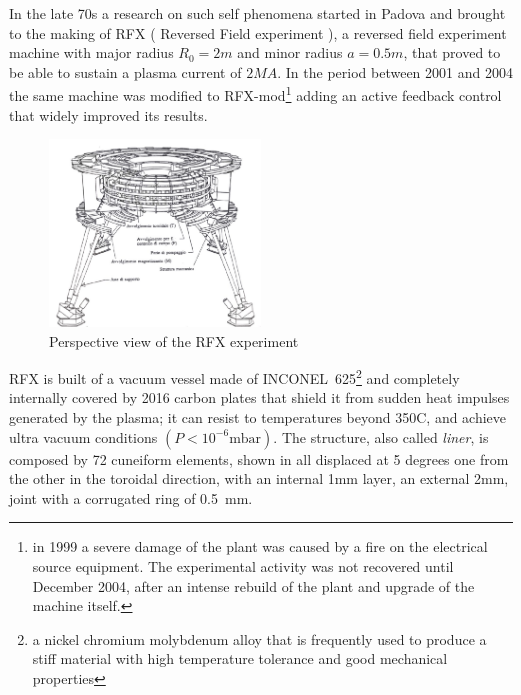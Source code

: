 In the late 70s a research on such self phenomena started in Padova and brought to the making of RFX ( Reversed Field experiment ), a reversed field experiment machine with major radius $R_0 = 2m$ and minor radius $a = 0.5m$, that proved to be able to sustain a plasma current of $2MA$. In the period between 2001 and 2004 the same machine was modified to RFX-mod\footnote{in 1999 a severe damage of the plant was caused by a fire on the electrical source equipment. The experimental activity was not recovered until December 2004, after an intense rebuild of the plant and upgrade of the machine itself.} adding an active feedback control that widely improved its results.
\begin{figure}[ht!]
\centering
\includegraphics[width=0.5\textwidth]{img/rfx2}
\caption{ Perspective view of the RFX experiment }
\label{img:rfx}
\end{figure}
%
RFX is built of a vacuum vessel made of INCONEL~625\footnote{a nickel chromium molybdenum alloy that is frequently used to produce a stiff material with high temperature tolerance and good mechanical properties} and completely internally covered by 2016 carbon plates that shield it from sudden heat impulses generated by the plasma; it can resist to temperatures beyond 350C, and achieve ultra vacuum conditions $(P < 10^{-6} \text{mbar})$.
The structure, also called \textit{liner}, is composed by 72 cuneiform elements, shown in \Figure{\ref{fig:rfx_liner}} all displaced at 5 degrees one from the other in the toroidal direction, with an internal 1mm layer, an external 2mm, joint with a corrugated ring of 0.5~mm.
